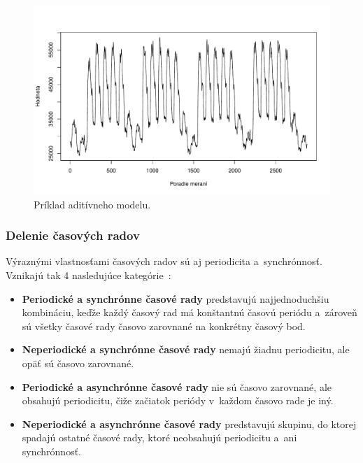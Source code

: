 \documentclass[a4paper,twoside,slovak,12pt,appendix]{article}
\begin{document}
\begin{figure}[!ht]
  \centering
  \includegraphics[width=\textwidth]{add_model.pdf}
  \caption{Príklad aditívneho modelu.}
  \label{fig:add-time-series-model}
\end{figure}


\subsubsection{Delenie časových radov}
Výraznými vlastnosťami časových radov sú aj periodicita a~synchrónnosť. Vznikajú
tak 4 nasledujúce kategórie~\cite{Teng2010}:
\begin{itemize}
	\item \textbf{Periodické a synchrónne časové rady} predstavujú najjednoduchšiu
	kombináciu, keďže každý časový rad má konštantnú časovú periódu a~zároveň sú
	všetky časové rady časovo zarovnané na konkrétny časový bod.

	\item \textbf{Neperiodické a synchrónne časové rady} nemajú žiadnu periodicitu,
	ale opäť sú časovo zarovnané.

	\item \textbf{Periodické a asynchrónne časové rady} nie sú časovo zarovnané, ale
	obsahujú periodicitu, čiže 	začiatok periódy v~každom časovo rade je iný.

	\item \textbf{Neperiodické a asynchrónne časové rady} predstavujú skupinu, do ktorej
	spadajú ostatné časové rady, ktoré neobsahujú	periodicitu a~ani synchrónnosť.
\end{itemize}
\end{document}
